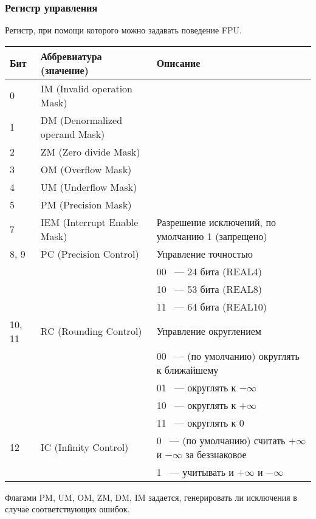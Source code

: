 \label{FPU_control_word}
\subsubsection{Регистр управления}

Регистр, при помощи которого можно задавать поведение \ac{FPU}.

\begin{center}
\begin{tabular}{ | l | l | l | }
\hline
Бит &
Аббревиатура (значение) &
Описание \\
\hline
0   & IM (Invalid operation Mask) & \\
\hline
1   & DM (Denormalized operand Mask) & \\
\hline
2   & ZM (Zero divide Mask) & \\
\hline
3   & OM (Overflow Mask) & \\
\hline
4   & UM (Underflow Mask) & \\
\hline
5   & PM (Precision Mask) & \\
\hline
7   & IEM (Interrupt Enable Mask) & Разрешение исключений, по умолчанию 1 (запрещено) \\
\hline
8, 9 & PC (Precision Control) & Управление точностью \\
     &                        & 00 ~--- 24 бита (REAL4) \\
     &                        & 10 ~--- 53 бита (REAL8) \\
     &                        & 11 ~--- 64 бита (REAL10) \\
\hline
10, 11 & RC (Rounding Control) & Управление округлением \\
       &                       & 00 ~--- (по умолчанию) округлять к ближайшему \\
       &                       & 01 ~--- округлять к $-\infty$ \\
       &                       & 10 ~--- округлять к $+\infty$ \\
       &                       & 11 ~--- округлять к 0 \\
\hline
12 & IC (Infinity Control) & 0 ~--- (по умолчанию) считать $+\infty$ и $-\infty$ за беззнаковое \\
   &                       & 1 ~--- учитывать и $+\infty$ и $-\infty$ \\
\hline
\end{tabular}
\end{center}

Флагами PM, UM, OM, ZM, DM, IM 
задается, генерировать ли исключения в случае соответствующих ошибок.

